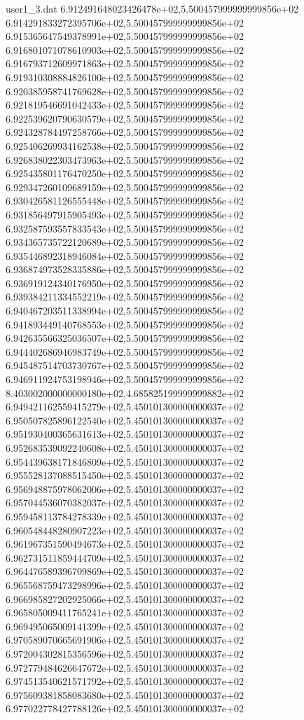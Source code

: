 \begin{filecontents}{user1_3.dat}
6.912491648023426478e+02,5.500457999999999856e+02
6.914291833272395706e+02,5.500457999999999856e+02
6.915365647549378991e+02,5.500457999999999856e+02
6.916801071078610903e+02,5.500457999999999856e+02
6.916793712609971863e+02,5.500457999999999856e+02
6.919310308884826100e+02,5.500457999999999856e+02
6.920385958741769628e+02,5.500457999999999856e+02
6.921819546691042433e+02,5.500457999999999856e+02
6.922539620790630579e+02,5.500457999999999856e+02
6.924328784497258766e+02,5.500457999999999856e+02
6.925406269934162538e+02,5.500457999999999856e+02
6.926838022303473963e+02,5.500457999999999856e+02
6.925435801176470250e+02,5.500457999999999856e+02
6.929347260109689159e+02,5.500457999999999856e+02
6.930426581126555448e+02,5.500457999999999856e+02
6.931856497915905493e+02,5.500457999999999856e+02
6.932587593557833543e+02,5.500457999999999856e+02
6.934365735722120689e+02,5.500457999999999856e+02
6.935446892318946084e+02,5.500457999999999856e+02
6.936874973528335886e+02,5.500457999999999856e+02
6.936919124340176950e+02,5.500457999999999856e+02
6.939384211334552219e+02,5.500457999999999856e+02
6.940467203511338994e+02,5.500457999999999856e+02
6.941893449140768553e+02,5.500457999999999856e+02
6.942635566325036507e+02,5.500457999999999856e+02
6.944402686946983749e+02,5.500457999999999856e+02
6.945487514703730767e+02,5.500457999999999856e+02
6.946911924753198946e+02,5.500457999999999856e+02
8.403002000000000180e+02,4.685825199999999882e+02
6.949421162559415279e+02,5.450101300000000037e+02
6.950507825896122540e+02,5.450101300000000037e+02
6.951930400365631613e+02,5.450101300000000037e+02
6.952683539092240608e+02,5.450101300000000037e+02
6.954439638171846809e+02,5.450101300000000037e+02
6.955528137088515450e+02,5.450101300000000037e+02
6.956948875978062006e+02,5.450101300000000037e+02
6.957044536070382037e+02,5.450101300000000037e+02
6.959458113784278339e+02,5.450101300000000037e+02
6.960548448280907223e+02,5.450101300000000037e+02
6.961967351590494673e+02,5.450101300000000037e+02
6.962731511859444709e+02,5.450101300000000037e+02
6.964476589396709869e+02,5.450101300000000037e+02
6.965568759473298996e+02,5.450101300000000037e+02
6.966985827202925066e+02,5.450101300000000037e+02
6.965805009411765241e+02,5.450101300000000037e+02
6.969495065009141399e+02,5.450101300000000037e+02
6.970589070665691906e+02,5.450101300000000037e+02
6.972004302815356596e+02,5.450101300000000037e+02
6.972779484626647672e+02,5.450101300000000037e+02
6.974513540621571792e+02,5.450101300000000037e+02
6.975609381858083680e+02,5.450101300000000037e+02
6.977022778427788126e+02,5.450101300000000037e+02

\end{filecontents}
